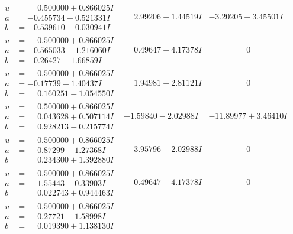 \documentclass[1p]{elsarticle_modified}
\theoremstyle{definition}
\begin{document}
$$\begin{array}{c|c|c}
\begin{aligned}
u &= \phantom{-}0.500000 + 0.866025 I \\
a &= -0.455734 - 0.521331 I \\
b &= -0.539610 - 0.030941 I\end{aligned}
 & \phantom{-}2.99206 - 1.44519 I & -3.20205 + 3.45501 I \\ \hline\begin{aligned}
u &= \phantom{-}0.500000 + 0.866025 I \\
a &= -0.565033 + 1.216060 I \\
b &= -0.26427 - 1.66859 I\end{aligned}
 & \phantom{-}0.49647 - 4.17378 I & \phantom{-0.000000 } 0 \\ \hline\begin{aligned}
u &= \phantom{-}0.500000 + 0.866025 I \\
a &= -0.17739 + 1.40437 I \\
b &= \phantom{-}0.160251 - 1.054550 I\end{aligned}
 & \phantom{-}1.94981 + 2.81121 I & \phantom{-0.000000 } 0 \\ \hline\begin{aligned}
u &= \phantom{-}0.500000 + 0.866025 I \\
a &= \phantom{-}0.043628 + 0.507114 I \\
b &= \phantom{-}0.928213 - 0.215774 I\end{aligned}
 & -1.59840 - 2.02988 I & -11.89977 + 3.46410 I \\ \hline\begin{aligned}
u &= \phantom{-}0.500000 + 0.866025 I \\
a &= \phantom{-}0.87299 - 1.27368 I \\
b &= \phantom{-}0.234300 + 1.392880 I\end{aligned}
 & \phantom{-}3.95796 - 2.02988 I & \phantom{-0.000000 } 0 \\ \hline\begin{aligned}
u &= \phantom{-}0.500000 + 0.866025 I \\
a &= \phantom{-}1.55443 - 0.33903 I \\
b &= \phantom{-}0.022743 + 0.944463 I\end{aligned}
 & \phantom{-}0.49647 - 4.17378 I & \phantom{-0.000000 } 0 \\ \hline\begin{aligned}
u &= \phantom{-}0.500000 + 0.866025 I \\
a &= \phantom{-}0.27721 - 1.58998 I \\
b &= \phantom{-}0.019390 + 1.138130 I\end{aligned}

\end{array}$$
\end{document}

